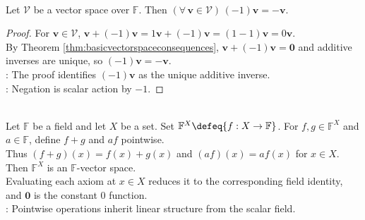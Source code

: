 \begin{corollary} \label{cor:negativeoneactsasinverse} \\
\leanok Let $\mathcal{V}$ be a vector space over $\mathbb{F}$. Then $(\forall\,\mathbf{v}\in\mathcal{V})\,(-1)\mathbf{v}=-\mathbf{v}$.
\begin{proof}
\leanok For $\mathbf{v}\in\mathcal{V}$, $\mathbf{v}+(-1)\mathbf{v}=1\mathbf{v}+(-1)\mathbf{v}=(1-1)\mathbf{v}=0\mathbf{v}$.\\
By Theorem \ref{thm:basicvectorspaceconsequences}, $\mathbf{v}+(-1)\mathbf{v}=\mathbf{0}$ and additive inverses are unique, so $(-1)\mathbf{v}=-\mathbf{v}$.\\
: The proof identifies $(-1)\mathbf{v}$ as the unique additive inverse.\\
: Negation is scalar action by $-1$.
\end{proof}
\end{corollary}

\begin{example} \label{ex:roman-vector-space-examples} \\
Let $\mathbb{F}$ be a field and let $X$ be a set. Set $\mathbb{F}^{X}\defeq\{f:X\to\mathbb{F}\}$. For $f,g\in\mathbb{F}^{X}$ and $a\in\mathbb{F}$, define $f+g$ and $af$ pointwise.\\
Thus $(f+g)(x)=f(x)+g(x)$ and $(af)(x)=af(x)$ for $x\in X$. Then $\mathbb{F}^{X}$ is an $\mathbb{F}$-vector space.\\
Evaluating each axiom at $x\in X$ reduces it to the corresponding field identity, and $\mathbf{0}$ is the constant $0$ function.\\
: Pointwise operations inherit linear structure from the scalar field.
\end{example}
